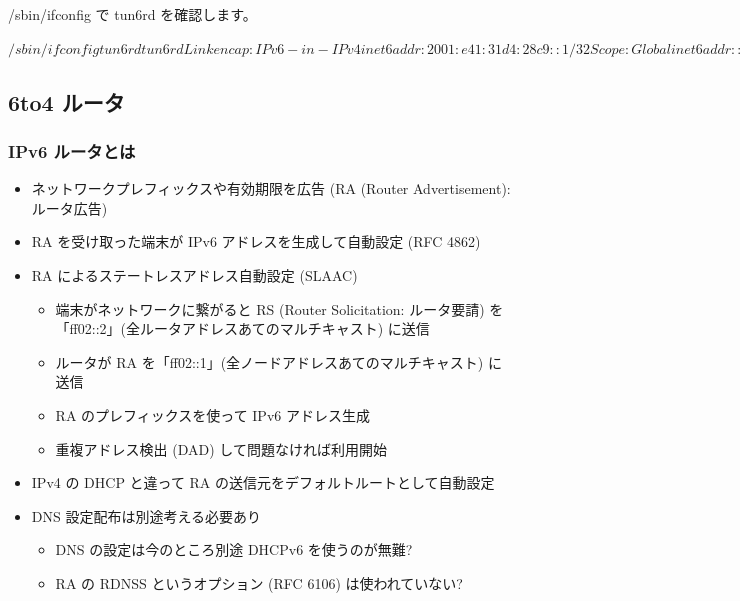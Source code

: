 \documentclass[mingoth,a4paper]{jsarticle}
\begin{document}
/sbin/ifconfig で tun6rd を確認します。

\begin{commandline}
$ /sbin/ifconfig tun6rd
tun6rd    Link encap:IPv6-in-IPv4
          inet6 addr: 2001:e41:31d4:28c9::1/32 Scope:Global
          inet6 addr: ::49.212.40.201/128 Scope:Compat
          UP RUNNING NOARP  MTU:1280  Metric:1
          RX packets:16336 errors:0 dropped:0 overruns:0 frame:0
          TX packets:21361 errors:0 dropped:0 overruns:0 carrier:0
          collisions:0 txqueuelen:0
          RX bytes:1854845 (1.7 MiB)  TX bytes:6845907 (6.5 MiB)

$
\end{commandline}
\subsection{6to4 ルータ}

\subsubsection{IPv6 ルータとは}


\begin{itemize}
\item ネットワークプレフィックスや有効期限を広告 (RA (Router Advertisement): ルータ広告)
\item RA を受け取った端末が IPv6 アドレスを生成して自動設定 (RFC 4862)
\item RA によるステートレスアドレス自動設定 (SLAAC)

\begin{itemize}
\item 端末がネットワークに繋がると RS (Router Solicitation: ルータ要請) を
    「ff02::2」(全ルータアドレスあてのマルチキャスト) に送信
\item ルータが RA を「ff02::1」(全ノードアドレスあてのマルチキャスト) に送信
\item RA のプレフィックスを使って IPv6 アドレス生成
\item 重複アドレス検出 (DAD) して問題なければ利用開始
\end{itemize}

\item IPv4 の DHCP と違って RA の送信元をデフォルトルートとして自動設定
\item DNS 設定配布は別途考える必要あり

\begin{itemize}
\item DNS の設定は今のところ別途 DHCPv6 を使うのが無難?
\item RA の RDNSS というオプション (RFC 6106) は使われていない?
\end{itemize}

\end{itemize}
\end{document}
